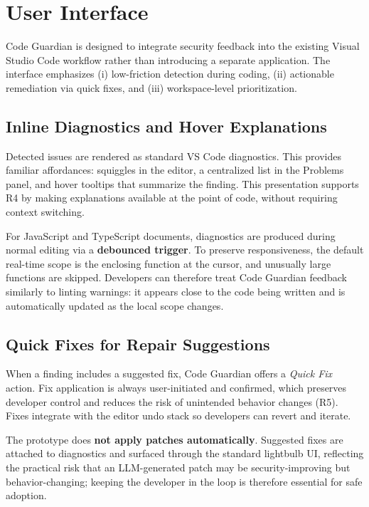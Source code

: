 \section{User Interface}
\label{sec:impl-ui}

Code Guardian is designed to integrate security feedback into the existing Visual Studio Code workflow rather than introducing a separate application. The interface emphasizes (i) low-friction detection during coding, (ii) actionable remediation via quick fixes, and (iii) workspace-level prioritization.

\subsection{Inline Diagnostics and Hover Explanations}
\label{subsec:ui-diagnostics}

Detected issues are rendered as standard VS Code diagnostics. This provides familiar affordances: squiggles in the editor, a centralized list in the Problems panel, and hover tooltips that summarize the finding. This presentation supports R4 by making explanations available at the point of code, without requiring context switching.

For JavaScript and TypeScript documents, diagnostics are produced during normal editing via a \textbf{debounced trigger}. To preserve responsiveness, the default real-time scope is the enclosing function at the cursor, and unusually large functions are skipped. Developers can therefore treat Code Guardian feedback similarly to linting warnings: it appears close to the code being written and is automatically updated as the local scope changes.

\subsection{Quick Fixes for Repair Suggestions}
\label{subsec:ui-quickfix}

When a finding includes a suggested fix, Code Guardian offers a \textit{Quick Fix} action. Fix application is always user-initiated and confirmed, which preserves developer control and reduces the risk of unintended behavior changes (R5). Fixes integrate with the editor undo stack so developers can revert and iterate.

The prototype does \textbf{not apply patches automatically}. Suggested fixes are attached to diagnostics and surfaced through the standard lightbulb UI, reflecting the practical risk that an LLM-generated patch may be security-improving but behavior-changing; keeping the developer in the loop is therefore essential for safe adoption.

